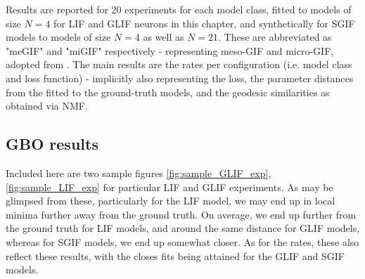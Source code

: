 \documentclass[mphil,deptreport,ianc]{infthesis} %
\begin{document}
Results are reported for 20 experiments for each model class, fitted to models of size $N=4$ for LIF and GLIF neurons in this chapter, and synthetically for SGIF models to models of size $N=4$ as well as $N=21$.
These are abbreviated as "meGIF" and "miGIF" respectively - representing meso-GIF and micro-GIF, adopted from \cite{Rene2020}.
The main results are the rates per configuration (i.e. model class and loss function) - implicitly also representing the loss, the parameter distances from the fitted to the ground-truth models, and the geodesic similarities as obtained via NMF.

\subsection{GBO results}


Included here are two sample figures \ref{fig:sample_GLIF_exp}, \ref{fig:sample_LIF_exp} for particular LIF and GLIF experiments.
As may be glimpsed from these, particularly for the LIF model, we may end up in local minima further away from the ground truth. On average, we end up further from the ground truth for LIF models, and around the same distance for GLIF models, whereas for SGIF models, we end up somewhat closer.
As for the rates, these also reflect these results, with the closes fits being attained for the GLIF and SGIF models.
\end{document}
